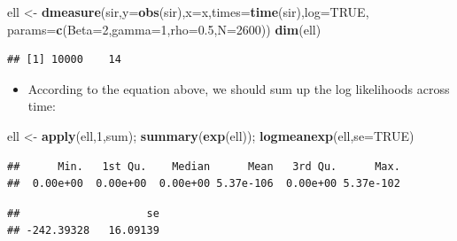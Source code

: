 \documentclass[]{article}
\newenvironment{Shaded}{\begin{snugshade}}{\end{snugshade}}
\newcommand{\KeywordTok}[1]{\textcolor[rgb]{0.13,0.29,0.53}{\textbf{#1}}}
\newcommand{\DataTypeTok}[1]{\textcolor[rgb]{0.13,0.29,0.53}{#1}}
\newcommand{\DecValTok}[1]{\textcolor[rgb]{0.00,0.00,0.81}{#1}}
\newcommand{\FloatTok}[1]{\textcolor[rgb]{0.00,0.00,0.81}{#1}}
\newcommand{\StringTok}[1]{\textcolor[rgb]{0.31,0.60,0.02}{#1}}
\newcommand{\OtherTok}[1]{\textcolor[rgb]{0.56,0.35,0.01}{#1}}
\newcommand{\NormalTok}[1]{#1}
\providecommand{\tightlist}{%
  \setlength{\itemsep}{0pt}\setlength{\parskip}{0pt}}
\begin{document}
\begin{Shaded}
\begin{Highlighting}[]
\NormalTok{ell <-}\StringTok{ }\KeywordTok{dmeasure}\NormalTok{(sir,}\DataTypeTok{y=}\KeywordTok{obs}\NormalTok{(sir),}\DataTypeTok{x=}\NormalTok{x,}\DataTypeTok{times=}\KeywordTok{time}\NormalTok{(sir),}\DataTypeTok{log=}\OtherTok{TRUE}\NormalTok{,}
                \DataTypeTok{params=}\KeywordTok{c}\NormalTok{(}\DataTypeTok{Beta=}\DecValTok{2}\NormalTok{,}\DataTypeTok{gamma=}\DecValTok{1}\NormalTok{,}\DataTypeTok{rho=}\FloatTok{0.5}\NormalTok{,}\DataTypeTok{N=}\DecValTok{2600}\NormalTok{))}
\KeywordTok{dim}\NormalTok{(ell)}
\end{Highlighting}
\end{Shaded}

\begin{verbatim}
## [1] 10000    14
\end{verbatim}

\begin{itemize}
\tightlist
\item
  According to the equation above, we should sum up the log likelihoods
  across time:
\end{itemize}

\begin{Shaded}
\begin{Highlighting}[]
\NormalTok{ell <-}\StringTok{ }\KeywordTok{apply}\NormalTok{(ell,}\DecValTok{1}\NormalTok{,sum); }\KeywordTok{summary}\NormalTok{(}\KeywordTok{exp}\NormalTok{(ell)); }\KeywordTok{logmeanexp}\NormalTok{(ell,}\DataTypeTok{se=}\OtherTok{TRUE}\NormalTok{)}
\end{Highlighting}
\end{Shaded}

\begin{verbatim}
##      Min.   1st Qu.    Median      Mean   3rd Qu.      Max. 
##  0.00e+00  0.00e+00  0.00e+00 5.37e-106  0.00e+00 5.37e-102
\end{verbatim}

\begin{verbatim}
##                    se 
## -242.39328   16.09139
\end{verbatim}
\end{document}
